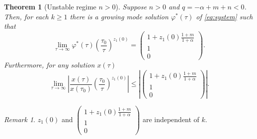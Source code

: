 \documentclass[a4paper,11pt]{article}
\newtheorem{theorem}{Theorem}
\theoremstyle{remark}
\newtheorem{remark}{Remark}[section]
\begin{document}
\begin{theorem}[Unstable regime $n>0$] Suppose $n>0$ and $q=-\alpha+m+n<0$. Then, for each $k\ge1$ there is a growing mode solution $\varphi^*(\tau)$ of \eqref{eq:system} such that
$$\lim_{\tau \rightarrow \infty} \varphi^*(\tau)\left(\frac{\tau_0}{\tau}\right)^{z_1(0)} = \begin{pmatrix} 1+z_1(0)\frac{1+m}{1+\alpha}\\1\\0\end{pmatrix}.$$
Furthermore, for any solution $x(\tau)$
$$\lim_{\tau \rightarrow \infty} \left|\frac{x(\tau)}{x(\tau_0)}\left(\frac{\tau_0}{\tau}\right)^{z_1(0)}\right| \le \left|\begin{pmatrix} 1+z_1(0)\frac{1+m}{1+\alpha}\\1\\0\end{pmatrix}\right|.$$
\end{theorem}
\begin{remark}
$z_1(0)$ and $\begin{pmatrix} 1+z_1(0)\frac{1+m}{1+\alpha}\\1\\0\end{pmatrix}$ are independent of $k$. 
\end{remark}
\end{document}
